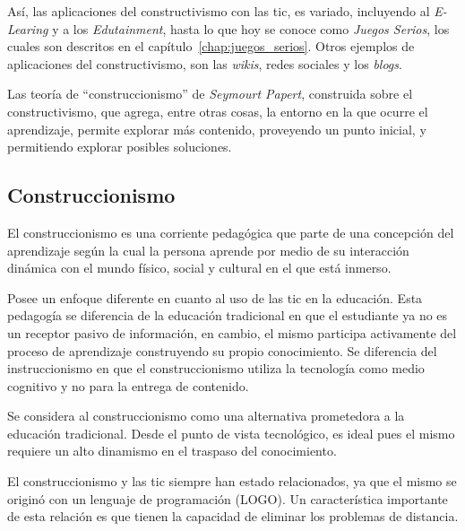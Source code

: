 Así, las aplicaciones del constructivismo con las \Gls{tic}, es variado,
incluyendo al \textit{E-Learing} y a los \textit{Edutainment}, hasta lo que hoy
se conoce como \textit{Juegos Serios}, los cuales son descritos en el
capítulo~\ref{chap:juegos_serios}. Otros ejemplos de aplicaciones del
constructivismo, son las \textit{wikis}, redes sociales y los
\textit{blogs}\cite{hernandez:constructivismo}.

Las teoría de \enquote{construccionismo} de \textit{Seymourt Papert},
construida sobre el constructivismo, que agrega, entre otras cosas, la
entorno en la que ocurre el aprendizaje\cite{egenfeldt2007third}, permite
explorar más contenido, proveyendo un punto inicial, y permitiendo explorar
posibles soluciones.
 


\subsection{Construccionismo}
\label{sec:tics_construccionismo}

El construccionismo es una corriente pedagógica que parte de una concepción del
aprendizaje según la cual la persona aprende por medio de su interacción
dinámica con el mundo físico, social y cultural en el que está
inmerso\cite{valdivia:sg}.

Posee un enfoque diferente en cuanto al uso de las \Gls{tic} en la educación.
Esta pedagogía se diferencia de la educación tradicional en que el estudiante ya
no es un receptor pasivo de información, en cambio, el mismo participa
activamente del proceso de aprendizaje construyendo su propio conocimiento. Se
diferencia del instruccionismo en que el construccionismo utiliza la tecnología
como medio cognitivo y no para la entrega de contenido.

Se considera al construccionismo como una alternativa prometedora a la educación
tradicional. Desde el punto de vista tecnológico, es ideal pues el mismo
requiere un alto dinamismo en el traspaso del
conocimiento\cite{sasha:construtivism}. 

El construccionismo y las \Gls{tic} siempre han estado relacionados, ya que el
mismo se originó con un lenguaje de programación (LOGO)\cite{ict:ttc}. Un
característica importante de esta relación es que tienen la capacidad de
eliminar los problemas de distancia\cite{mariluz:seiousgames}.


